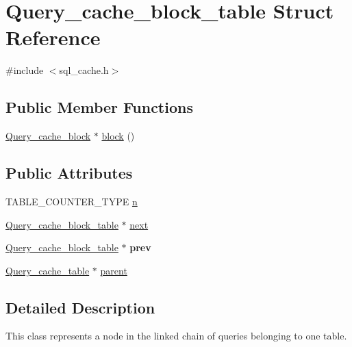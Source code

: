 \hypertarget{structQuery__cache__block__table}{}\section{Query\+\_\+cache\+\_\+block\+\_\+table Struct Reference}
\label{structQuery__cache__block__table}


{\ttfamily \#include $<$sql\+\_\+cache.\+h$>$}

\subsection*{Public Member Functions}
\begin{DoxyCompactItemize}
\item 
\mbox{\hyperlink{structQuery__cache__block}{Query\+\_\+cache\+\_\+block}} $\ast$ \mbox{\hyperlink{structQuery__cache__block__table_a78a2985cc946dd25eb1cb239b7c4033e}{block}} ()
\end{DoxyCompactItemize}
\subsection*{Public Attributes}
\begin{DoxyCompactItemize}
\item 
T\+A\+B\+L\+E\+\_\+\+C\+O\+U\+N\+T\+E\+R\+\_\+\+T\+Y\+PE \mbox{\hyperlink{structQuery__cache__block__table_a49ac84a1f8f0dfbdd15ae144e21b7d4b}{n}}
\item 
\mbox{\hyperlink{structQuery__cache__block__table}{Query\+\_\+cache\+\_\+block\+\_\+table}} $\ast$ \mbox{\hyperlink{structQuery__cache__block__table_a98a811e0dd09e8df360c267125ef0ba3}{next}}
\item 
\mbox{\label{structQuery__cache__block__table_a26303bcdfef9dd2d909d366d9ed4fb9d}} 
\mbox{\hyperlink{structQuery__cache__block__table}{Query\+\_\+cache\+\_\+block\+\_\+table}} $\ast$ {\bfseries prev}
\item 
\mbox{\hyperlink{structQuery__cache__table}{Query\+\_\+cache\+\_\+table}} $\ast$ \mbox{\hyperlink{structQuery__cache__block__table_a8691dff022dcd857e42fc7ece18c0dc9}{parent}}
\end{DoxyCompactItemize}


\subsection{Detailed Description}
This class represents a node in the linked chain of queries belonging to one table.


